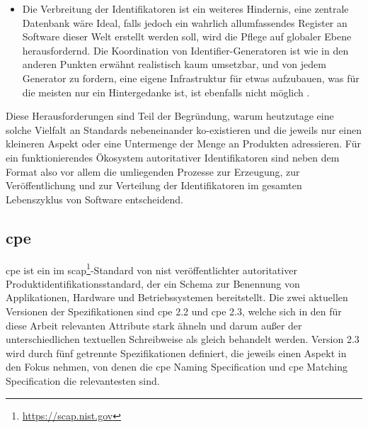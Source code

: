 \begin{itemize}
    \item Die Verbreitung der Identifikatoren ist ein weiteres Hindernis, eine zentrale Datenbank wäre Ideal, falls jedoch ein wahrlich allumfassendes Register an Software dieser Welt erstellt werden soll, wird die Pflege auf globaler Ebene herausfordernd.
    Die Koordination von Identifier-Generatoren ist wie in den anderen Punkten erwähnt realistisch kaum umsetzbar, und von jedem Generator zu fordern, eine eigene Infrastruktur für etwas aufzubauen, was für die meisten nur ein Hintergedanke ist, ist ebenfalls nicht möglich \autocite{CISA2023}.
\end{itemize}

Diese Herausforderungen sind Teil der Begründung, warum heutzutage eine solche Vielfalt an Standards nebeneinander ko-existieren und die jeweils nur einen kleineren Aspekt oder eine Untermenge der Menge an Produkten adressieren.
Für ein funktionierendes Ökosystem autoritativer Identifikatoren sind neben dem Format also vor allem die umliegenden Prozesse zur Erzeugung, zur Veröffentlichung und zur Verteilung der Identifikatoren im gesamten Lebenszyklus von Software entscheidend.

\subsection{\acrfull{cpe}}


\acrshort{cpe} ist ein im \acrfull{scap}\footnote{\url{https://scap.nist.gov}}-Standard von \acrshort{nist} veröffentlichter autoritativer Produktidentifikationsstandard, der ein Schema zur Benennung von Applikationen, Hardware und Betriebssystemen bereitstellt.
Die zwei aktuellen Versionen der Spezifikationen sind \acrshort{cpe} 2.2 und \acrshort{cpe} 2.3, welche sich in den für diese Arbeit relevanten Attribute stark ähneln und darum außer der unterschiedlichen textuellen Schreibweise als gleich behandelt werden.
Version 2.3 wird durch fünf getrennte Spezifikationen definiert, die jeweils einen Aspekt in den Fokus nehmen, von denen die \acrshort{cpe} Naming Specification \autocite{Cheikes_Waltermire_Scarfone_2011} und \acrshort{cpe} Matching Specification \autocite{Parmelee_Booth_Waltermire_Scarfone_2011} die relevantesten sind.

